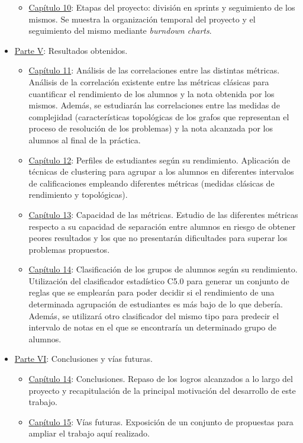 \begin{itemize}
\begin{itemize}
\item \hyperref[chapter:sprints]{Capítulo 10}: Etapas del proyecto: división en sprints y seguimiento de los mismos. Se muestra la organización temporal del proyecto y el seguimiento del mismo mediante \emph{burndown charts}.
\end{itemize}
\item \hyperref[sec:parteV]{Parte V}: Resultados obtenidos.
\begin{itemize}
\item \hyperref[chapter:correlations]{Capítulo 11}: Análisis de las correlaciones entre las distintas métricas. Análisis de la correlación existente entre las métricas clásicas para cuantificar el rendimiento de los alumnos y la nota obtenida por los mismos. Además, se estudiarán las correlaciones entre las medidas de complejidad (características topológicas de los grafos que representan el proceso de resolución de los problemas) y la nota alcanzada por los alumnos al final de la práctica.
\item \hyperref[sec:chapterXII]{Capítulo 12}: Perfiles de estudiantes según su rendimiento. Aplicación de técnicas de clustering para agrupar a los alumnos en diferentes intervalos de calificaciones empleando diferentes métricas (medidas clásicas de rendimiento y topológicas).
\item \hyperref[sec:diferencias]{Capítulo 13}: Capacidad de las métricas. Estudio de las diferentes métricas respecto a su capacidad de separación entre alumnos en riesgo de obtener peores resultados y los que no presentarán dificultades para superar los problemas propuestos.
\item \hyperref[sec:chapterXIII]{Capítulo 14}: Clasificación de los grupos de alumnos según su rendimiento. Utilización del clasificador estadístico C5.0 para generar un conjunto de reglas que se emplearán para poder decidir si el rendimiento de una determinada agrupación de estudiantes es más bajo de lo que debería. Además, se utilizará otro clasificador del mismo tipo para predecir el intervalo de notas en el que se encontraría un determinado grupo de alumnos.
\end{itemize}
\item \hyperref[sec:parteVI]{Parte VI}: Conclusiones y vías futuras.
\begin{itemize}
\item \hyperref[sec:chapterXIV]{Capítulo 14}: Conclusiones. Repaso de los logros alcanzados a lo largo del proyecto y recapitulación de la principal motivación del desarrollo de este trabajo.
\item \hyperref[sec:chapterXV]{Capítulo 15}: Vías futuras. Exposición de un conjunto de propuestas para ampliar el trabajo aquí realizado.
\end{itemize}
\end{itemize}